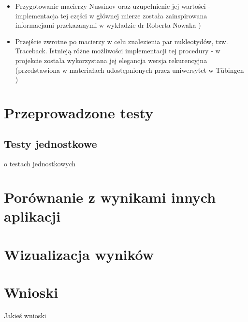 \documentclass[paper=a4, fontsize=11pt]{scrartcl} %
\numberwithin{equation}{section} %
\numberwithin{figure}{section} %
\numberwithin{table}{section} %
\begin{document}
\begin{itemize}

	\item Przygotowanie macierzy Nussinov oraz uzupełnienie jej wartości - implementacja tej części w głównej mierze została zainspirowana informacjami przekazanymi w wykładzie dr Roberta Nowaka \cite{bib:slajdyNowak})
	\item Przejście zwrotne po macierzy w celu znalezienia par nukleotydów, tzw. Traceback. Istnieją różne możliwości implementacji tej procedury - w projekcie została wykorzystana jej elegancja wersja rekurencyjna (przedstawiona w materiałach udostępnionych przez uniwersytet w Tübingen \cite{bib:slajdyTubigen})
	
\end{itemize}


\section{Przeprowadzone testy}

\subsection{Testy jednostkowe}
o testach jednostkowych 

 

\section{Porównanie z wynikami innych aplikacji}

 

\section{Wizualizacja wyników}

\section{Wnioski}

Jakieś wnioski

\renewcommand{\refname}{\normalfont\selectfont\normalsize Literatura i źródła} 



\end{document}
